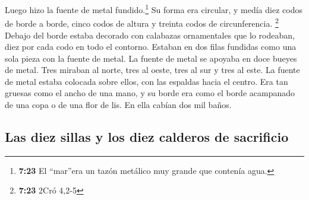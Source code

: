  Luego hizo la fuente de metal fundido.\footnote{\textbf{7:23}
  El ``mar''era un tazón metálico muy grande que contenía agua.} Su
forma era circular, y medía diez codos de borde a borde, cinco codos de
altura y treinta codos de circunferencia. \footnote{\textbf{7:23} 2Cró
  4,2-5}  Debajo del borde estaba decorado con calabazas
ornamentales que lo rodeaban, diez por cada codo en todo el contorno.
Estaban en dos filas fundidas como una sola pieza con la fuente de
metal.  La fuente de metal se apoyaba en doce bueyes de
metal. Tres miraban al norte, tres al oeste, tres al sur y tres al este.
La fuente de metal estaba colocada sobre ellos, con las espaldas hacia
el centro.  Era tan gruesas como el ancho de una mano, y
su borde era como el borde acampanado de una copa o de una flor de lis.
En ella cabían dos mil baños.

\hypertarget{las-diez-sillas-y-los-diez-calderos-de-sacrificio}{%
\subsection{Las diez sillas y los diez calderos de
sacrificio}\label{las-diez-sillas-y-los-diez-calderos-de-sacrificio}}

